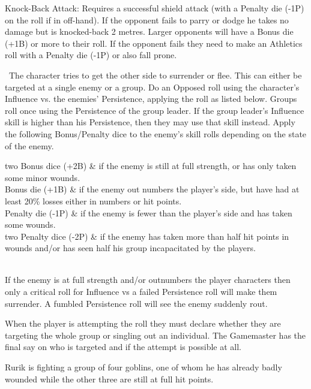 \begin{description}
\begin{rpg-list}
		\item Knock-Back Attack: Requires a successful shield attack (with a Penalty die (-1P) on the roll if in off-hand). If the opponent fails to parry or dodge he takes no damage but is knocked-back 2 metres. Larger opponents will have a Bonus die (+1B) or more to their roll. If the opponent fails they need to make an Athletics roll with a Penalty die (-1P) or also fall prone.
		\end{rpg-list}
	\item[Intimidate/Persuade:]  The character tries to get the other side to surrender or flee. This can either be targeted at a single enemy or a group.  Do an Opposed roll using the character’s Influence vs. the enemies’ Persistence, applying the roll as listed below. Groups roll once using the Persistence of the group leader. If the group leader’s Influence skill is higher than his Persistence, then they may use that skill instead. Apply the following Bonus/Penalty dice to the enemy’s skill rolls depending on the state of the enemy.
	\begin{rpg-table}[|c|X|]
		\hline
		two Bonus dice (+2B) & if the enemy is still at full strength, or has only taken some minor wounds.\\
		Bonus die (+1B) & if the enemy out numbers the player’s side, but have had at least 20\% losses either in numbers or hit points.\\
		Penalty die (-1P) & if the enemy is fewer than the player’s side and has taken some wounds.\\
		two Penalty dice (-2P) & if the enemy has taken more than half hit points in wounds and/or has seen half his group incapacitated by the players.\\
		\hline
		\\
		\hline
	\end{rpg-table}

If the enemy is at full strength and/or outnumbers the player characters then only a critical roll for Influence vs a failed Persistence roll will make them surrender. A fumbled Persistence roll will see the enemy suddenly rout.

When the player is attempting the roll they must declare whether they are targeting the whole group or singling out an individual. The Gamemaster has the final say on who is targeted and if the attempt is possible at all. 

	\begin{rpg-examplebox}
Rurik is fighting a group of four goblins, one of whom he has already badly wounded while the other three are still at full hit points. 


\end{rpg-examplebox}
\end{description}
